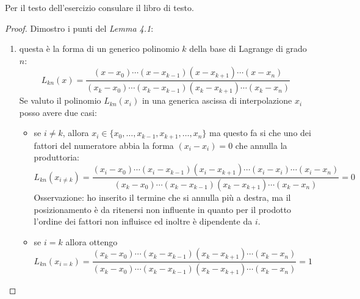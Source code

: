 \begin{exercise}[4.3] 
Per il testo dell'esercizio consulare il libro di testo.
\end{exercise}
\begin{proof}
Dimostro i punti del \emph{Lemma 4.1}:
\begin{enumerate}
  \item \label{exercise43proofPoint1} questa \`e la forma di un generico
  polinomio $k$ della base di Lagrange di grado $n$:
  \begin{displaymath}
  L_{kn}(x) = \frac{(x-x_{0}) \cdots (x-x_{k-1})(x-x_{k+1})\cdots (x-x_{n})}
  	{(x_{k}-x_{0}) \cdots (x_{k}-x_{k-1})(x_{k}-x_{k+1})\cdots (x_{k}-x_{n})}
  \end{displaymath}
  Se valuto il polinomio $L_{kn}(x_{i})$ in una generica ascissa di
  interpolazione $x_{i}$ posso avere due casi:
  \begin{itemize}
    \item se $i \not = k$, allora $x_{i} \in \{
    x_{0},\ldots,x_{k-1},x_{k+1},\ldots,x_{n} \}$ ma questo fa si che uno dei
    fattori del numeratore abbia la forma $(x_{i} - x_{i}) = 0$ che annulla la
    produttoria:
    \begin{displaymath}
  L_{kn}(x_{i\not = k}) = \frac{(x_{i}-x_{0}) \cdots
  (x_{i}-x_{k-1})(x_{i}-x_{k+1})\cdots (x_{i}-x_{i}) \cdots (x_{i}-x_{n})}
  	{(x_{k}-x_{0}) \cdots (x_{k}-x_{k-1})(x_{k}-x_{k+1})\cdots (x_{k}-x_{n})} = 0
  \end{displaymath}
  Osservazione: ho inserito il termine che si annulla pi\`u a destra, ma il
  posizionamento \`e da ritenersi non influente in quanto per il prodotto
  l'ordine dei fattori non influisce ed inoltre \`e dipendente da $i$.
    \item se $i = k$ allora ottengo
    \begin{displaymath}
  L_{kn}(x_{i = k}) = \frac{(x_{k}-x_{0}) \cdots
  (x_{k}-x_{k-1})(x_{k}-x_{k+1})\cdots (x_{k}-x_{n})}
  	{(x_{k}-x_{0}) \cdots (x_{k}-x_{k-1})(x_{k}-x_{k+1})\cdots (x_{k}-x_{n})} = 1
  \end{displaymath}
  \end{itemize}
  

\end{enumerate}
\end{proof}
